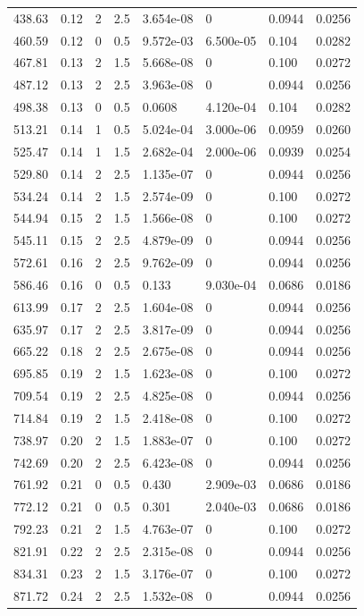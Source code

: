 \documentclass[preview]{standalone}
\begin{document}
{{\begin{tabular}{L{1.2cm}C{1.2cm} C{0.3cm}C{0.5cm} C{1.4cm}C{1.4cm} C{1.4cm}C{1.4cm}}
  438.63  &  0.12  & 2     & 2.5 &  3.654e-08  & 0  & 0.0944 &  0.0256   \\ 
  460.59  &  0.12  & 0     & 0.5 &  9.572e-03  & 6.500e-05  & 0.104 &  0.0282   \\ 
  467.81  &  0.13  & 2     & 1.5 &  5.668e-08  & 0  & 0.100 &  0.0272   \\ 
  487.12  &  0.13  & 2     & 2.5 &  3.963e-08  & 0  & 0.0944 &  0.0256   \\ 
  498.38  &  0.13  & 0     & 0.5 &  0.0608  & 4.120e-04  & 0.104 &  0.0282   \\ 
  513.21  &  0.14  & 1     & 0.5 &  5.024e-04  & 3.000e-06  & 0.0959 &  0.0260   \\ 
  525.47  &  0.14  & 1     & 1.5 &  2.682e-04  & 2.000e-06  & 0.0939 &  0.0254   \\ 
  529.80  &  0.14  & 2     & 2.5 &  1.135e-07  & 0  & 0.0944 &  0.0256   \\ 
  534.24  &  0.14  & 2     & 1.5 &  2.574e-09  & 0  & 0.100 &  0.0272   \\ 
  544.94  &  0.15  & 2     & 1.5 &  1.566e-08  & 0  & 0.100 &  0.0272   \\ 
  545.11  &  0.15  & 2     & 2.5 &  4.879e-09  & 0  & 0.0944 &  0.0256   \\ 
  572.61  &  0.16  & 2     & 2.5 &  9.762e-09  & 0  & 0.0944 &  0.0256   \\ 
  586.46  &  0.16  & 0     & 0.5 &  0.133  & 9.030e-04  & 0.0686 &  0.0186   \\ 
  613.99  &  0.17  & 2     & 2.5 &  1.604e-08  & 0  & 0.0944 &  0.0256   \\ 
  635.97  &  0.17  & 2     & 2.5 &  3.817e-09  & 0  & 0.0944 &  0.0256   \\ 
  665.22  &  0.18  & 2     & 2.5 &  2.675e-08  & 0  & 0.0944 &  0.0256   \\ 
  695.85  &  0.19  & 2     & 1.5 &  1.623e-08  & 0  & 0.100 &  0.0272   \\ 
  709.54  &  0.19  & 2     & 2.5 &  4.825e-08  & 0  & 0.0944 &  0.0256   \\ 
  714.84  &  0.19  & 2     & 1.5 &  2.418e-08  & 0  & 0.100 &  0.0272   \\ 
  738.97  &  0.20  & 2     & 1.5 &  1.883e-07  & 0  & 0.100 &  0.0272   \\ 
  742.69  &  0.20  & 2     & 2.5 &  6.423e-08  & 0  & 0.0944 &  0.0256   \\ 
  761.92  &  0.21  & 0     & 0.5 &  0.430  & 2.909e-03  & 0.0686 &  0.0186   \\ 
  772.12  &  0.21  & 0     & 0.5 &  0.301  & 2.040e-03  & 0.0686 &  0.0186   \\ 
  792.23  &  0.21  & 2     & 1.5 &  4.763e-07  & 0  & 0.100 &  0.0272   \\ 
  821.91  &  0.22  & 2     & 2.5 &  2.315e-08  & 0  & 0.0944 &  0.0256   \\ 
  834.31  &  0.23  & 2     & 1.5 &  3.176e-07  & 0  & 0.100 &  0.0272   \\ 
  871.72  &  0.24  & 2     & 2.5 &  1.532e-08  & 0  & 0.0944 &  0.0256   \\ 
\hline 
\end{tabular} 

}}
\end{document}
